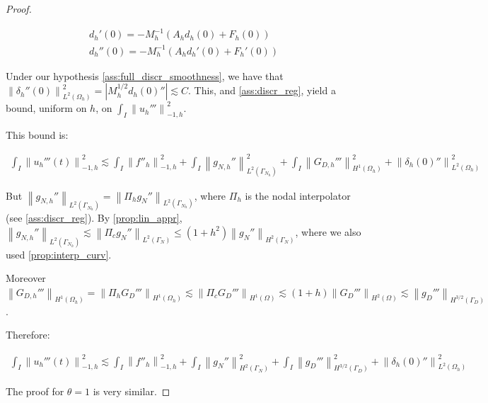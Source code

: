 \documentclass[english,a4paper,9pt,oneside]{scrbook}	%
\theoremstyle{break}
\newenvironment{mproof}[1][\proofname]{%
  \begin{proof}[#1]$ $\par\nobreak\ignorespaces
}{%
  \end{proof}
}
\renewcommand*{\proofname}{Proof}
\theoremstyle{remark}
\newcommand{\ds}{\displaystyle}
\newcommand{\norm}[1]{\left\lVert#1\right\rVert}
\begin{document}
\begin{appendices}
\begin{mproof}
\begin{align*}
	d_h'(0)=-M_h^{-1}(A_h d_h(0)+F_h(0))\\
	d_h''(0)=-M_h^{-1}(A_h d_h'(0)+F_h'(0))
\end{align*}

Under our hypothesis \cref{ass:full_discr_smoothness}, we have that $\norm{\delta_h''(0)}_{L^2(\Omega_h)}^2 = |M^{1/2}_hd_h(0)''|\lesssim C$. This, and \cref{ass:discr_reg}, yield a bound, uniform on $h$, on $\ds \int_I \norm{u_h'''}_{-1,h}^2$.

This bound is:

\begin{align*}
	\int_I \norm{u_h'''(t)}_{-1,h}^2\lesssim \int_I \norm{f''_h}_{-1,h}^2+\int_I\norm{g_{N,h}''}_{L^2(\Gamma_{N_h})}^2 + \int_I\norm{G_{D,h}'''}_{H^1(\Omega_h)}^2 + \norm{\delta_{h}(0)''}_{L^2(\Omega_h)}^2
\end{align*}

But $\norm{g_{N,h}''}_{L^2(\Gamma_{N_h})}=\norm{\Pi_h g_{N}''}_{L^2(\Gamma_{N_h})}$, where $\Pi_h$ is the nodal interpolator (see \cref{ass:discr_reg}). By \cref{prop:lin_appr}, $\norm{g_{N,h}''}_{L^2(\Gamma_{N_h})}\lesssim \norm{\Pi_c g_{N}''}_{L^2(\Gamma_{N})}\leq (1+h^2)\norm{ g_{N}''}_{H^2(\Gamma_{N})}$, where we also used \cref{prop:interp_curv}.

Moreover $\norm{G_{D,h}'''}_{H^1(\Omega_h)} = \norm{\Pi_h G_D'''}_{H^1(\Omega_h)}\lesssim  \norm{\Pi_c G_D'''}_{H^1(\Omega)}\lesssim (1+h)\norm{G_D'''}_{H^2(\Omega)}\lesssim \norm{g_D'''}_{H^{3/2}(\Gamma_D)}$.

Therefore:

\begin{align*}
	\int_I \norm{u_h'''(t)}_{-1,h}^2\lesssim \int_I \norm{f''_h}_{-1,h}^2+\int_I\norm{ g_{N}''}_{H^{2}(\Gamma_{N})}^2 + \int_I\norm{g_D'''}_{H^{3/2}(\Gamma_D)}^2 + \norm{\delta_{h}(0)''}_{L^2(\Omega_h)}^2
\end{align*}


The proof for $\theta=1$ is very similar.


\end{mproof}
\end{appendices}
\end{document}
